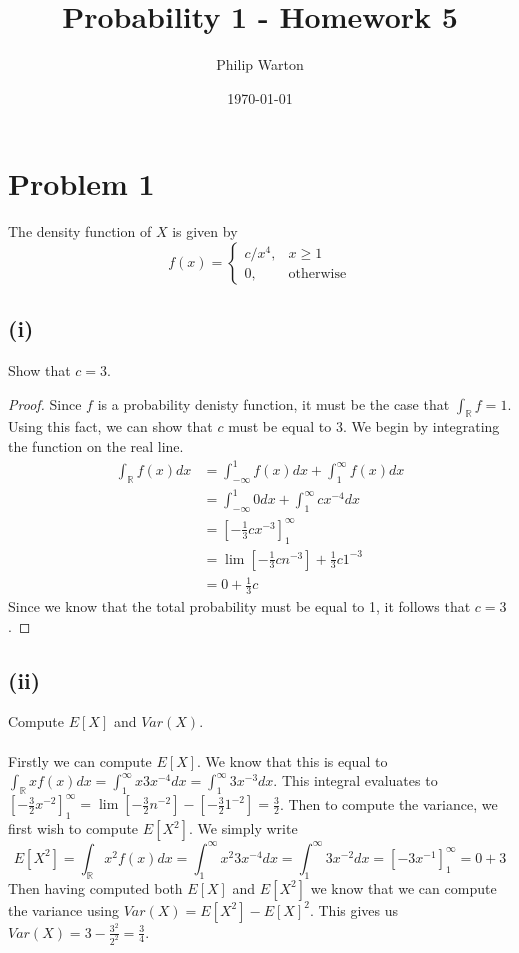 \documentclass{article}
\begin{document}
\title{Probability 1 - Homework 5}
\author{Philip Warton}
\date{\today}
\maketitle
\section*{Problem 1}
The density function of $X$ is given by 
\[
    f(x) =
    \begin{cases}
        c / x^4, & x \geqslant 1\\
        0, & \text{otherwise}
    \end{cases}  
\]
\subsection*{(i)}
    Show that $c = 3$.
    \begin{proof}
        Since $f$ is a probability denisty function, it must be the case that $\int_\mathbb{R} f = 1$.
        Using this fact, we can show that $c$ must be equal to 3. We begin by integrating the function on
        the real line.
        \begin{align*}
            \int_\mathbb{R} f(x) dx & = \int_{-\infty}^1 f(x) dx + \int_1^\infty f(x) dx \\
            &=  \int_{-\infty}^1 0 dx + \int_1^\infty c x^{-4} dx \\
            &= \left[ -\frac{1}{3}  c x^{-3}  \right]_1^\infty \\
            &= \lim\left[ -\frac{1}{3} c n^{-3}\right] + \frac{1}{3} c 1^{-3} \\
            &= 0 + \frac{1}{3} c
        \end{align*}
        Since we know that the total probability must be equal to 1, it follows that $c = 3$.
    \end{proof}
\subsection*{(ii)}
    Compute $E[X]$ and $Var(X)$.\\\\
        Firstly we can compute $E[X]$. We know that this is equal to $\int_\mathbb{R} x f(x) dx = \int_1^\infty x 3 x^{-4} dx = \int_1^\infty 3 x^{-3} dx$.
        This integral evaluates to $\left[ -\frac{3}{2} x^{-2} \right]_1^\infty = \lim\left[-\frac{3}{2} n^{-2}\right] - \left[-\frac{3}{2} 1^{-2}\right] = \frac{3}{2}$.
        Then to compute the variance, we first wish to compute $E[X^2]$. We simply write
        \[
            E[X^2] = \int_\mathbb{R} x^2 f(x) dx = \int_1^\infty x^2 3 x^{-4} dx = \int_1^\infty 3x^{-2} dx = \left[-3x^{-1}\right]_1^\infty = 0 + 3
        \]
        Then having computed both $E[X]$ and $E[X^2]$ we know that we can compute the variance using $Var(X) = E[X^2] - E[X]^2$. This gives us $Var(X) = 3 - \frac{3^2}{2^2} = \frac{3}{4}$.
\end{document}
